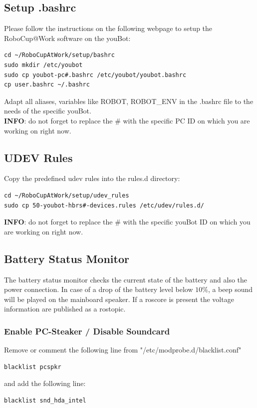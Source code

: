 \documentclass[a4paper,12pt]{article}
\begin{document}
\subsection{Setup .bashrc}
Please follow the instructions on the following webpage to setup the RoboCup@Work software on the youBot:
\begin{lstlisting}
cd ~/RoboCupAtWork/setup/bashrc
sudo mkdir /etc/youbot
sudo cp youbot-pc#.bashrc /etc/youbot/youbot.bashrc	    
cp user.bashrc ~/.bashrc
\end{lstlisting}

Adapt all aliases, variables like ROBOT, ROBOT\_ENV in the .bashrc file to the needs of the specific youBot.\\

\textbf{INFO}: do not forget to replace the \# with the specific PC ID on which you are working on right now.


\subsection{UDEV Rules}
Copy the predefined udev rules into the rules.d directory:
\begin{lstlisting}
cd ~/RoboCupAtWork/setup/udev_rules
sudo cp 50-youbot-hbrs#-devices.rules /etc/udev/rules.d/
\end{lstlisting}

\textbf{INFO}: do not forget to replace the \# with the specific youBot ID on which you are working on right now.

\subsection{Battery Status Monitor}
The battery status monitor checks the current state of the battery and also the power connection. In case of a drop of the battery level below $ 10\% $, a beep sound will be played on the mainboard speaker. If a roscore is present the voltage information are published as a rostopic. 

\subsubsection{Enable PC-Steaker / Disable Soundcard}
Remove or comment the following line from "/etc/modprobe.d/blacklist.conf"
\begin{lstlisting}
blacklist pcspkr
\end{lstlisting}
    
and add the following line:
\begin{lstlisting}
blacklist snd_hda_intel
\end{lstlisting}
    
\end{document}
